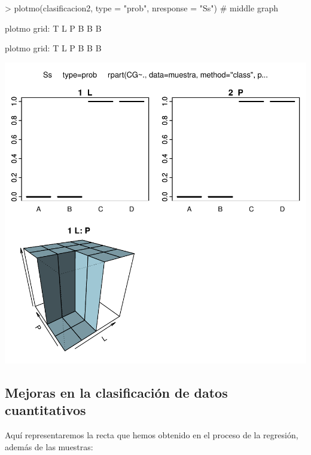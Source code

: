 \documentclass [a4paper] {article}
\begin{document}
\begin{Schunk}
\begin{Sinput}
> plotmo(clasificacion2, type = "prob", nresponse = "Ss") # middle graph
\end{Sinput}
\begin{Soutput}
 plotmo grid:    T L P
                 B B B
\end{Soutput}
\begin{Soutput}
 plotmo grid:    T L P
                 B B B
\end{Soutput}
\end{Schunk}
\includegraphics{Memoria-Figura 10}


\newpage
\subsection{Mejoras en la clasificación de datos cuantitativos}
Aquí representaremos la recta que hemos obtenido en el proceso de la regresión, además de las muestras:
\end{document}
